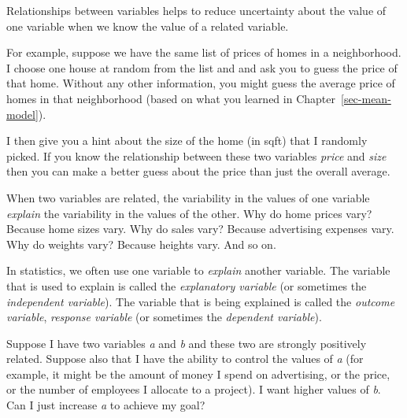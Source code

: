 \documentclass[
  12pt,
  letterpaper,
  DIV=11,
  numbers=noendperiod]{scrreprt}
\begin{document}
Relationships between variables helps to reduce uncertainty about the
value of one variable when we know the value of a related variable.

For example, suppose we have the same list of prices of homes in a
neighborhood. I choose one house at random from the list and and ask you
to guess the price of that home. Without any other information, you
might guess the average price of homes in that neighborhood (based on
what you learned in Chapter~\ref{sec-mean-model}).

I then give you a hint about the size of the home (in sqft) that I
randomly picked. If you know the relationship between these two
variables \emph{price} and \emph{size} then you can make a better guess
about the price than just the overall average.

When two variables are related, the variability in the values of one
variable \emph{explain} the variability in the values of the other. Why
do home prices vary? Because home sizes vary. Why do sales vary? Because
advertising expenses vary. Why do weights vary? Because heights vary.
And so on.

In statistics, we often use one variable to \emph{explain} another
variable. The variable that is used to explain is called the
\emph{explanatory variable} (or sometimes the \emph{independent
variable}). The variable that is being explained is called the
\emph{outcome variable}, \emph{response variable} (or sometimes the
\emph{dependent variable}).

\begin{tcolorbox}[enhanced jigsaw, colback=white, leftrule=.75mm, toprule=.15mm, bottomtitle=1mm, breakable, coltitle=black, toptitle=1mm, title={Quick Check}, opacitybacktitle=0.6, colbacktitle=quarto-callout-note-color!10!white, arc=.35mm, left=2mm, colframe=quarto-callout-note-color-frame, titlerule=0mm, rightrule=.15mm, bottomrule=.15mm, opacityback=0]

Suppose I have two variables \emph{a} and \emph{b} and these two are
strongly positively related. Suppose also that I have the ability to
control the values of \emph{a} (for example, it might be the amount of
money I spend on advertising, or the price, or the number of employees I
allocate to a project). I want higher values of \emph{b}. Can I just
increase \emph{a} to achieve my goal?

\end{tcolorbox}
\end{document}
